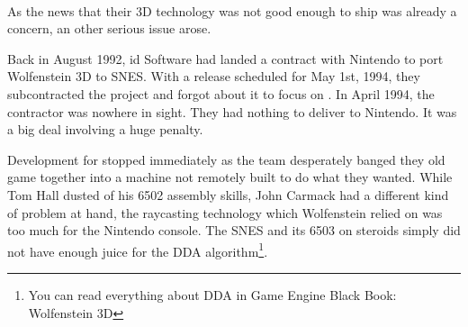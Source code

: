 \\
\par
{}%
\label{HUD_screenshot}
\par
As the news that their 3D technology was not good enough to ship was already a concern, an other serious issue arose.\\
\par
Back in August 1992, id Software had landed a contract with Nintendo to port Wolfenstein 3D to SNES. With a release scheduled for May 1st, 1994, they subcontracted the project and forgot about it to focus on \doom. In April 1994, the contractor was nowhere in sight. They had nothing to deliver to Nintendo. It was a big deal involving a huge penalty.\\
\par
 Development for \doom{} stopped immediately as the team desperately banged they old game together into a machine not remotely built to do what they wanted. While Tom Hall dusted of his 6502 assembly skills, John Carmack had a different kind of problem at hand, the raycasting technology which Wolfenstein relied on was too much for the Nintendo console. The SNES and its 6503 on steroids simply did not have enough juice for the DDA algorithm\footnote{You can read everything about DDA in Game Engine Black Book: Wolfenstein 3D}.\\%
\par



